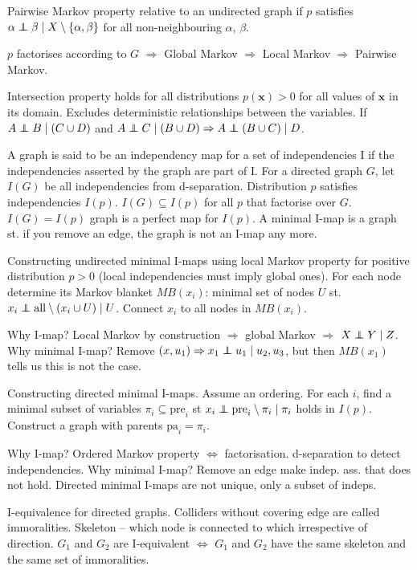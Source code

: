 \documentclass[twocolumn]{article}
\newcommand\ind{\protect\mathpalette{\protect\independenT}{\perp}}
\def\independenT#1#2{\mathrel{\rlap{$#1#2$}\mkern2mu{#1#2}}}
\begin{document}
Pairwise Markov property relative to an undirected graph if $p$ satisfies $\alpha\ind\beta\mid X\setminus\{\alpha,\beta\}$ for all non-neighbouring $\alpha$, $\beta$.

$p$ factorises according to $G$ $\Rightarrow$ Global Markov $\Rightarrow$ Local Markov $\Rightarrow$ Pairwise Markov.

Intersection property holds for all distributions $p(\mathbf{x})>0$ for all values of $\mathbf{x}$ in its domain. Excludes deterministic relationships between the variables. If $A\ind B\mid(C\cup D)$ and $A\ind C\mid(B\cup D) \Rightarrow A\ind (B\cup C)\mid D$.

A graph is said to be an independency map for a set of independencies I if the independencies asserted by the graph are part of I. For a directed graph $G$, let $I(G)$ be all independencies from d-separation. Distribution $p$ satisfies independencies $I(p)$. $I(G)\subseteq I(p)$ for all $p$ that factorise over $G$. $I(G)=I(p)$ graph is a perfect map for $I(p)$. A minimal I-map is a graph st. if you remove an edge, the graph is not an I-map any more.

Constructing undirected minimal I-maps using local Markov property for positive distribution $p>0$ (local independencies must imply global ones). For each node determine its Markov blanket $MB(x_i)$: minimal set of nodes $U$ st. $x_i\ind\text{all}\setminus(x_i\cup U)\mid U$. Connect $x_i$ to all nodes in $MB(x_i)$.

Why I-map? Local Markov by construction $\Rightarrow$ global Markov $\Rightarrow$ $X\ind Y\mid Z$. Why minimal I-map? Remove $(x,u_1) \Rightarrow x_1\ind u_1\mid u_2,u_3$, but then $MB(x_1)$ tells us this is not the case. 

Constructing directed minimal I-maps. Assume an ordering. For each $i$, find a minimal subset of variables $\pi_i\subseteq\text{pre}_i$ st $x_i\ind\text{pre}_i\setminus\pi_i\mid\pi_i$ holds in $I(p)$. Construct a graph with parents $\text{pa}_i=\pi_i$.

Why I-map? Ordered Markov property $\Leftrightarrow$ factorisation. d-separation to detect independencies. Why minimal I-map? Remove an edge make indep. ass. that does not hold. Directed minimal I-maps are not unique, only a subset of indeps.

I-equivalence for directed graphs. Colliders without covering edge are called immoralities. Skeleton -- which node is connected to which irrespective of direction. $G_1$ and $G_2$ are I-equivalent $\Leftrightarrow$ $G_1$ and $G_2$ have the same skeleton and the same set of immoralities.
\end{document}
